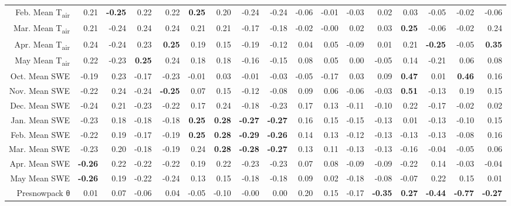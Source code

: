 \begin{table}[ht]
\begin{tabular}{rrrrrrrrrrrrrrrrr}
  Feb. Mean T\textsubscript{air} & 0.21 & \textbf{ -0.25 } & 0.22 & 0.22 & \textbf{ 0.25 } & 0.20 & -0.24 & -0.24 & -0.06 & -0.01 & -0.03 & 0.02 & 0.03 & -0.05 & -0.02 & -0.06 \\ 
  Mar. Mean T\textsubscript{air} & 0.21 & -0.24 & 0.24 & 0.24 & 0.21 & 0.21 & -0.17 & -0.18 & -0.02 & -0.00 & 0.02 & 0.03 & \textbf{ 0.25 } & -0.06 & -0.02 & 0.24 \\ 
  Apr. Mean T\textsubscript{air} & 0.24 & -0.24 & 0.23 & \textbf{ 0.25 } & 0.19 & 0.15 & -0.19 & -0.12 & 0.04 & 0.05 & -0.09 & 0.01 & 0.21 & \textbf{ -0.25 } & -0.05 & \textbf{ 0.35 } \\ 
  May Mean T\textsubscript{air} & 0.22 & -0.23 & \textbf{ 0.25 } & 0.24 & 0.18 & 0.18 & -0.16 & -0.15 & 0.08 & 0.05 & 0.00 & -0.05 & 0.14 & -0.21 & 0.06 & 0.08 \\ 
  Oct. Mean SWE & -0.19 & 0.23 & -0.17 & -0.23 & -0.01 & 0.03 & -0.01 & -0.03 & -0.05 & -0.17 & 0.03 & 0.09 & \textbf{ 0.47 } & 0.01 & \textbf{ 0.46 } & 0.16 \\ 
  Nov. Mean SWE & -0.22 & 0.24 & -0.24 & \textbf{ -0.25 } & 0.07 & 0.15 & -0.12 & -0.08 & 0.09 & 0.06 & -0.06 & -0.03 & \textbf{ 0.51 } & -0.13 & 0.19 & 0.15 \\ 
  Dec. Mean SWE & -0.24 & 0.21 & -0.23 & -0.22 & 0.17 & 0.24 & -0.18 & -0.23 & 0.17 & 0.13 & -0.11 & -0.10 & 0.22 & -0.17 & -0.02 & 0.02 \\ 
  Jan. Mean SWE & -0.23 & 0.18 & -0.18 & -0.18 & \textbf{ 0.25 } & \textbf{ 0.28 } & \textbf{ -0.27 } & \textbf{ -0.27 } & 0.16 & 0.15 & -0.15 & -0.13 & 0.01 & -0.13 & -0.10 & 0.15 \\ 
  Feb. Mean SWE & -0.22 & 0.19 & -0.17 & -0.19 & \textbf{ 0.25 } & \textbf{ 0.28 } & \textbf{ -0.29 } & \textbf{ -0.26 } & 0.14 & 0.13 & -0.12 & -0.13 & -0.13 & -0.13 & -0.08 & 0.16 \\ 
  Mar. Mean SWE & -0.23 & 0.20 & -0.18 & -0.19 & 0.24 & \textbf{ 0.28 } & \textbf{ -0.28 } & \textbf{ -0.27 } & 0.13 & 0.11 & -0.13 & -0.13 & -0.16 & -0.04 & -0.05 & 0.06 \\ 
  Apr. Mean SWE & \textbf{ -0.26 } & 0.22 & -0.22 & -0.22 & 0.19 & 0.22 & -0.23 & -0.23 & 0.07 & 0.08 & -0.09 & -0.09 & -0.22 & 0.14 & -0.03 & -0.04 \\ 
  May Mean SWE & \textbf{ -0.26 } & 0.19 & -0.22 & -0.24 & 0.13 & 0.15 & -0.18 & -0.18 & 0.09 & 0.02 & -0.18 & -0.08 & -0.07 & 0.22 & 0.15 & 0.01 \\ 
  Presnowpack θ\tnote{c} & 0.01 & 0.07 & -0.06 & 0.04 & -0.05 & -0.10 & -0.00 & 0.00 & 0.20 & 0.15 & -0.17 & \textbf{ -0.35 } & \textbf{ 0.27 } & \textbf{ -0.44 } & \textbf{ -0.77 } & \textbf{ -0.27 } \\ 

\end{tabular}
\end{table}
